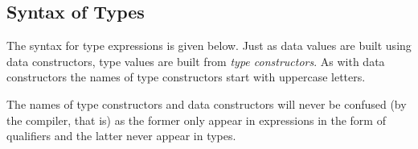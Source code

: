 \subsection{Syntax of Types}   \label{typesyntax}

The syntax for \frege{} type expressions is given below. Just as data values are built using data constructors, type values are built from \emph{type constructors}. As with data constructors the names of type constructors start with uppercase letters.

The names of type constructors and data constructors will never be confused (by the compiler, that is) as the former only appear in expressions in the form of qualifiers and the latter never appear in types.

\begin{flushleft}
     
   \alt{}  \\
  \sym {=>}    \alt{} \\
 \sym{(}  \sym{)} \sym{\arrow{}}   
  \alt{}  \sym{\arrow{}}                            
  \alt{}  \\
  
	\alt{} \sym{(}  \sym{)} \label{constraint}\\
   \\
  \sym{\arrow{}}  
  \alt {}\\
    
  \alt {}\\
  
  \alt {}           
  \alt \sym{(}  \sym{)}
  \alt \sym{(}  \sym{,}  \sym{)} 
  \alt \sym{\bracka{}}  \sym{\brackz{}}  
  \alt \sym{(}  \sym{|}  \sym{)} 
                                \\
  
    \alt \sym{(}\sym{::}\sym{)}\\

\end{flushleft}
